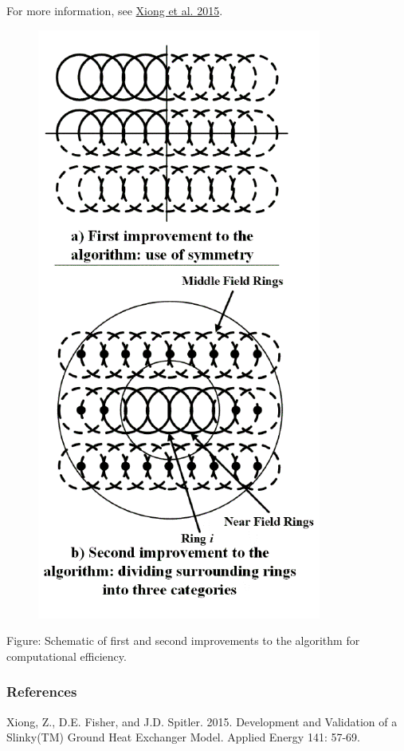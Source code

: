 For more information, see \protect\hyperlink{SlinkyReferenceXiong}{Xiong et al. 2015}.

\begin{figure}[htbp]
\centering
\includegraphics{media/image8001.png}
\caption{}
\end{figure}

Figure: Schematic of first and second improvements to the algorithm for computational efficiency.

\subsubsection{References}\label{references-3-002}

Xiong, Z., D.E. Fisher, and J.D. Spitler. 2015. Development and Validation of a Slinky(TM) Ground Heat Exchanger Model. Applied Energy 141: 57-69.


